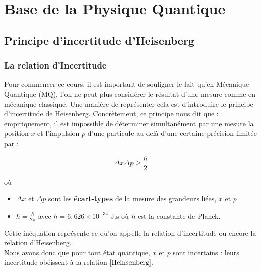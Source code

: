 \documentclass[../Notes de cours]{subfiles}
\begin{document}
\part{Base de la Physique Quantique}

\chapter{Principe d'incertitude d'Heisenberg}

\section{La relation d'Incertitude}
Pour commencer ce cours, il est important de souligner le fait qu'en Mécanique Quantique (MQ), l'on ne peut plus considérer le résultat d'une mesure comme en mécanique classique. 
Une manière de représenter cela est d'introduire le principe d'incertitude de Heisenberg. 
Concrètement, ce principe nous dit que : empiriquement, il est impossible de déterminer simultanément par une mesure la position $x$ et l'impulsion $p$ d'une particule au delà d'une certaine précision limitée par : 

\begin{equation}
\label{Heinsenberg}
\Delta x \Delta p \geq \frac{\hbar}{2}
\end{equation}

où 
\begin{itemize}[label = \textbullet]
	\item $\Delta x$ et $\Delta p$ sont les \textbf{écart-types} de la mesure des grandeurs liées, $x$ et $p$
	\item $\hbar = \frac{h}{2\pi}$ avec $h = 6,626 \times 10^{-34}$ J.s où $h$ est la constante de Planck. 
\end{itemize}


Cette inéquation représente ce qu'on appelle la relation d'incertitude ou encore la relation d'Heisenberg. \\
Nous avons donc que pour tout état quantique, $x$ et $p$ sont incertains : leurs incertitude obéissent à la relation $\ref{Heinsenberg}$. \\
\end{document}
